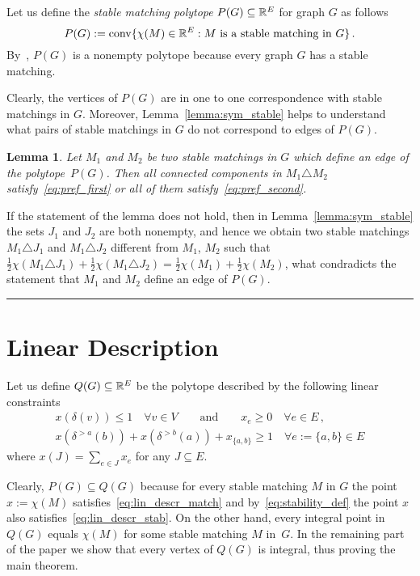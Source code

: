 \documentclass[preprint]{elsarticle}
\newtheorem{lemma}[fact]{Lemma}
\newenvironment{proof}{{\bf Proof:  }}{\hfill\rule{2mm}{2mm}}
\DeclareMathOperator{\convOp}{conv}
\newcommand{\conv}{\convOp}
\begin{document}
Let us define the \emph{stable matching polytope} $P(G)\subseteq\mathbb{R}^E$ for graph $G$ as follows
$$
	P(G):=\conv\{\chi(M)\in\R^E: M \text{ is a stable matching in } G\}\,.
$$
By~\cite{}, $P(G)$ is a nonempty polytope because every graph $G$ has a stable matching.

Clearly, the vertices of $P(G)$ are in one to one correspondence with stable matchings in $G$. Moreover, Lemma~\ref{lemma:sym_stable} helps to understand what pairs of stable matchings in $G$ do not correspond to edges of $P(G)$.

\begin{lemma}
Let $M_1$ and $M_2$ be two stable matchings in $G$ which define an edge of the polytope~$P(G)$. Then all connected components in $M_1\triangle M_2$ satisfy~\eqref{eq:pref_first} or all of them satisfy~\eqref{eq:pref_second}.  
\end{lemma}
\begin{proof}
If the statement of the lemma does not hold, then in Lemma~\ref{lemma:sym_stable} the sets $J_1$ and $J_2$ are both nonempty, and hence we obtain two stable matchings $M_1\triangle J_1$ and $M_1\triangle J_2$ different from $M_1$, $M_2$ such that $\frac{1}{2}\chi(M_1\triangle J_1)+\frac{1}{2}\chi(M_1\triangle J_2)=\frac{1}{2}\chi(M_1)+\frac{1}{2}\chi(M_2)$, what condradicts the statement that $M_1$ and $M_2$ define an edge of $P(G)$.
\end{proof}


\section{Linear Description}
Let us define $Q(G)\subseteq\mathbb{R}^E$ be the polytope described  by the following linear constraints
\begin{align}
x(\delta(v)) \leq 1\quad \forall v \in V\qquad \text{and} \qquad x_e \geq 0\quad \forall e \in E\,,\label{eq:lin_descr_match}\\
x(\delta^{>a}(b))+ x(\delta^{>b}(a)) + x_{\{a,b\}} \geq 1 \quad \forall e:=\{a,b\} \in E \label{eq:lin_descr_stab}
\end{align}
where $x(J) = \sum_{e \in J} x_e$ for any $J \subseteq E$.

Clearly, $P(G)\subseteq Q(G)$ because for every stable matching $M$ in $G$ the point $x:=\chi(M)$  satisfies~\eqref{eq:lin_descr_match} and by~\eqref{eq:stability_def} the point $x$ also satisfies~\eqref{eq:lin_descr_stab}. On the other hand, every integral point in $Q(G)$ equals $\chi(M)$ for some stable matching $M$ in~$G$. In the remaining part of the paper we show that every vertex of $Q(G)$ is integral, thus proving the main theorem.
\end{document}
